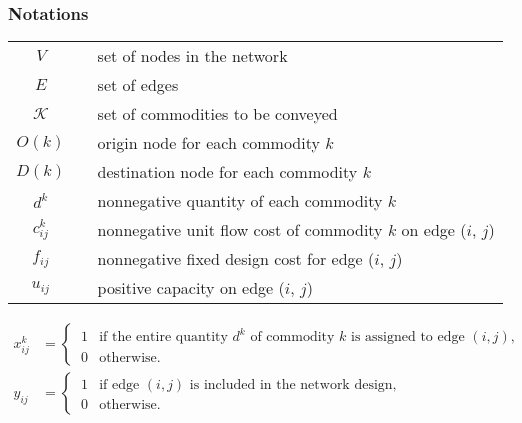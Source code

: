 \subsubsection*{Notations}
\begin{table}[!htbp]
\begin{tabular}{ccl}
    $V$ & & set of nodes in the network \\[0.5em]
    $E$ & & set of edges \\[0.5em]
    $\mathcal{K}$ & & set of commodities to be conveyed\\[0.5em]
    $O(k)$ & & origin node for each commodity $k$\\[0.5em]
    $D(k)$ & & destination node for each commodity $k$ \\[0.5em]
    $d^k$ & & nonnegative quantity of each commodity $k$\\[0.5em]
    $c_{ij}^k$ & & nonnegative unit flow cost of commodity $k$ on edge ($i$, $j$)\\[0.5em]
    $f_{ij}$ & & nonnegative fixed design cost for edge ($i$, $j$)\\[0.5em]
    $u_{ij}$ & & positive capacity on edge ($i$, $j$)\\[0.5em]
\end{tabular}
\end{table}
\begin{align*}
    x_{ij}^k &=
    \begin{cases}
    \ 1 & \text{if the entire quantity } d^k \text{ of commodity } k \text{ is assigned to edge }(i,j), \\
    \ 0 & \text{otherwise}.
    \end{cases}
    \\
    y_{ij} &=
    \begin{cases}
    \ 1 & \text{if edge } (i, j) \text{ is included in the network design}, \\
    \ 0 & \text{otherwise}.
    \end{cases}
\end{align*}

\vfill

